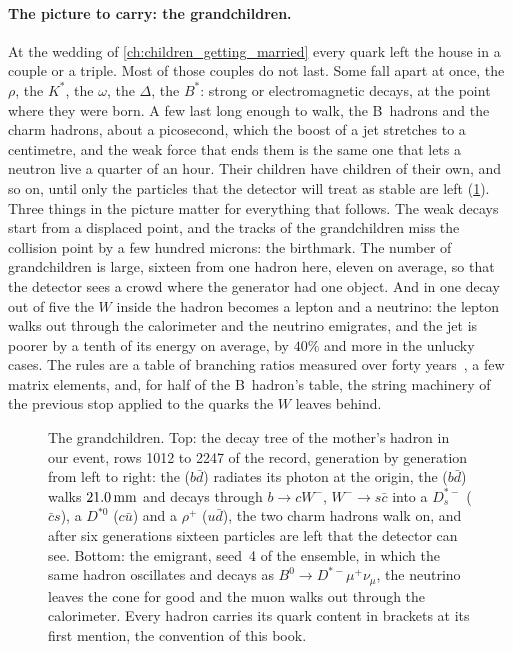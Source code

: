 \paragraph{The picture to carry: the grandchildren.}
At the wedding of
\cref{ch:children_getting_married} every quark left the house in a couple
or a triple. Most of those couples do not last. Some fall apart at once,
the $\rho$, the $K^*$, the $\omega$, the $\Delta$, the $B^*$: strong or
electromagnetic decays, at the point where they were born. A few last long
enough to walk, the B~hadrons and the charm hadrons, about a picosecond,
which the boost of a jet stretches to a centimetre, and the weak force that
ends them is the same one that lets a neutron live a quarter of an hour.
Their children have children of their own, and so on, until only the
particles that the detector will treat as stable are left
(\cref{fig:children_producing_grandchildren:family_sketch}). Three things in
the picture matter for everything that follows. The weak decays start from
a displaced point, and the tracks of the grandchildren miss the collision
point by a few hundred microns: the birthmark. The number of grandchildren
is large, sixteen from one hadron here, eleven on average, so that the
detector sees a crowd where the generator had one object. And in one decay
out of five the $W$ inside the hadron becomes a lepton and a neutrino: the
lepton walks out through the calorimeter and the neutrino emigrates, and
the jet is poorer by a tenth of its energy on average, by $40\%$ and
more in the unlucky cases. The rules are a table of branching ratios measured over
forty years~\cite{ParticleDataGroup:2024cfk,HeavyFlavorAveragingGroupHFLAV:2024ctg},
a few matrix elements, and, for half of the B~hadron's table, the string
machinery of the previous stop applied to the quarks the $W$ leaves behind.

\begin{figure}[htbp]\centering
\resizebox{\textwidth}{!}{}
\caption[The grandchildren: the decay tree of the mother's hadron and the
emigrant]{The grandchildren. Top: the decay tree of the mother's hadron in
our event, rows 1012 to 2247 of the record, generation by generation from
left to right: the \Bstarbar ($b\bar d$) radiates its photon at the
origin, the \Bbar ($b\bar d$) walks $21.0\,\mathrm{mm}$ and decays through
$b\to cW^-$, $W^-\to s\bar c$ into a $D_s^{*-}$ ($\bar cs$), a $D^{*0}$
($c\bar u$) and a $\rho^+$ ($u\bar d$), the two charm hadrons walk on, and
after six generations sixteen particles are left that the detector can
see. Bottom: the emigrant, seed~4 of the ensemble, in which the same
hadron oscillates and decays as $B^0\to D^{*-}\mu^+\nu_\mu$, the neutrino
leaves the cone for good and the muon walks out through the calorimeter.
Every hadron carries its quark content in brackets at its first mention,
the convention of this book.}
\label{fig:children_producing_grandchildren:family_sketch}
\end{figure}

